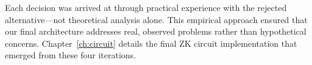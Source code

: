 Each decision was arrived at through practical experience with the rejected alternative---not theoretical analysis alone. This empirical approach ensured that our final architecture addresses real, observed problems rather than hypothetical concerns. Chapter~\ref{ch:circuit} details the final ZK circuit implementation that emerged from these four iterations.

